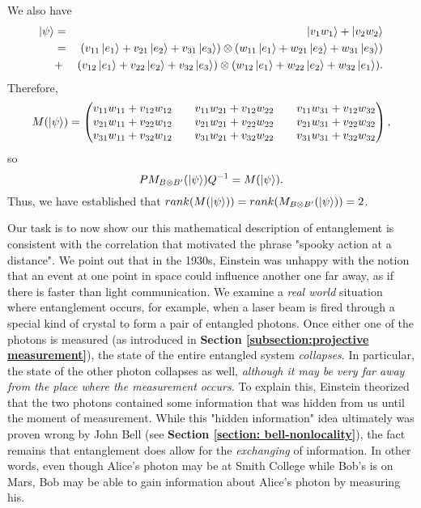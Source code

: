 \begin{example}

We also have
\begin{eqnarray*}
\ket{\psi}&=&\ket{v_1 w_1}+\ket{v_2 w_2}\\
&=& (v_{11}\ket{e_1}+v_{21}\ket{e_2}+v_{31}\ket{e_3}) \otimes (w_{11}\ket{e_1}+w_{21}\ket{e_2}+w_{31}\ket{e_3}) \\
&+& (v_{12}\ket{e_1}+v_{22}\ket{e_2}+v_{32}\ket{e_3}) \otimes (w_{12}\ket{e_1}+w_{22}\ket{e_2}+w_{32}\ket{e_1}).
\end{eqnarray*}
Therefore,
\begin{equation}
M(\ket{\psi})=
\begin{pmatrix}
v_{11}w_{11}+v_{12}w_{12} && v_{11}w_{21}+v_{12}w_{22} && v_{11}w_{31}+v_{12}w_{32}\\
v_{21}w_{11}+v_{22}w_{12} && v_{21}w_{21}+v_{22}w_{22} && v_{21}w_{31}+v_{22}w_{32} \\
v_{31}w_{11}+v_{32}w_{12} && v_{31}w_{21}+v_{32}w_{22} && v_{31}w_{31}+v_{32}w_{32} 
\end{pmatrix},
\end{equation}
so 
$$PM_{B \otimes B'}(\ket{\psi})Q^{-1}=M(\ket{\psi}).$$
Thus, we have established that $rank(M(\ket{\psi}))=rank(M_{B \otimes B'}(\ket{\psi}))=2$.
\end{example}



Our task is to now show our this mathematical description of entanglement is consistent with the correlation that motivated the phrase "spooky action at a distance". We point out that in the 1930s, Einstein was unhappy with the notion that an event at one point in space could influence another one far away, as if there is faster than light communication.  We examine a {\emph{real world}} situation where entanglement occurs, for example, when a laser beam is fired through a special kind of crystal to form a pair of entangled photons. Once either one of the photons is measured (as introduced in \textbf{Section \ref{subsection:projective measurement}}), the state of the entire entangled system {\emph{collapses}}.  In particular, the state of the other photon collapses as well, {\emph{although it may be very far away from the place where the measurement occurs.}} To explain this, Einstein theorized that the two photons contained some information that was hidden from us until the moment of measurement. While this "hidden information" idea ultimately was proven wrong by John Bell (see \textbf{Section \ref{section: bell-nonlocality}}), the fact remains that entanglement does allow for the {\emph{exchanging}} of information. In other words, even though Alice's photon may be at Smith College while Bob's is on Mars, Bob may be able to gain information about Alice's photon by measuring his. 

